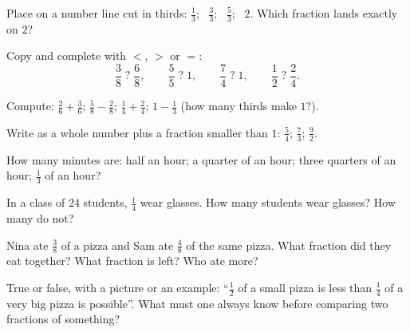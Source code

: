 \begin{exercise}[$\star$]\label{exo:g4:fractions:4}
Place on a number line cut in thirds: $\frac13$; \ $\frac33$; \
$\frac53$; \ $2$. Which fraction lands exactly on $2$?
\end{exercise}

\begin{exercise}[$\star$]\label{exo:g4:fractions:5}
Copy and complete with $<$, $>$ or $=$:
\[
\frac38 \;?\; \frac68, \qquad
\frac55 \;?\; 1, \qquad
\frac74 \;?\; 1, \qquad
\frac12 \;?\; \frac24 .
\]
\end{exercise}

\begin{exercise}[$\star$]\label{exo:g4:fractions:6}
Compute: $\frac26 + \frac36$; \quad $\frac58 - \frac28$; \quad
$\frac14 + \frac24$; \quad $1 - \frac13$ (how many thirds make
$1$?).
\end{exercise}

\begin{exercise}[$\star$]\label{exo:g4:fractions:7}
Write as a whole number plus a fraction smaller than $1$:
$\frac54$; \quad $\frac73$; \quad $\frac{9}{2}$.
\end{exercise}

\begin{exercise}[$\star$]\label{exo:g4:fractions:8}
How many minutes are: half an hour; a quarter of an hour; three
quarters of an hour; $\frac13$ of an hour?
\end{exercise}

\begin{exercise}[$\star$]\label{exo:g4:fractions:9}
In a class of $24$ students, $\frac14$ wear glasses. How many
students wear glasses? How many do not?
\end{exercise}

\begin{exercise}[$\star\star$]\label{exo:g4:fractions:10}
Nina ate $\frac38$ of a pizza and Sam ate $\frac48$ of the same
pizza. What fraction did they eat together? What fraction is left?
Who ate more?
\end{exercise}

\begin{exercise}[$\star\star$]\label{exo:g4:fractions:11}
True or false, with a picture or an example: ``$\frac12$ of a small
pizza is less than $\frac14$ of a very big pizza is possible''.
What must one always know before comparing two fractions of
something?
\end{exercise}
